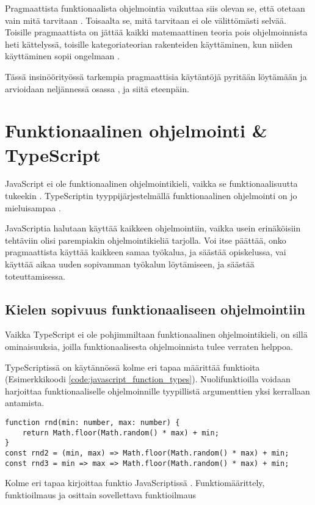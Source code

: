 Pragmaattista funktionaalista ohjelmointia vaikuttaa siis olevan se, että otetaan vain mitä tarvitaan \cite{dear_functional_bros,martin2017pragmaticfp,cantarella_fp_haitat}. Toisaalta se, mitä tarvitaan ei ole välittömästi selvää. Toisille pragmaattista on jättää kaikki matemaattinen teoria pois ohjelmoinnista heti kättelyssä, toisille kategoriateorian rakenteiden käyttäminen, kun niiden käyttäminen sopii ongelmaan \cite{holvikari2021category,martin2017pragmaticfp}.

Tässä insinöörityössä tarkempia pragmaattisia käytäntöjä pyritään löytämään ja arvioidaan neljännessä osassa \textcite{Empiirinen tutkimus}, ja siitä eteenpäin.

\section{Funktionaalinen ohjelmointi \& TypeScript}
JavaScript ei ole funktionaalinen ohjelmointikieli, vaikka se funktionaalisuutta tukeekin \cite{is_reduce_bad}. TypeScriptin tyyppijärjestelmällä funktionaalinen ohjelmointi on jo mieluisampaa \cite{holvikari2021category}.

JavaScriptia halutaan käyttää kaikkeen ohjelmointiin, vaikka usein erinäköisiin tehtäviin olisi parempiakin ohjelmointikieliä tarjolla. Voi itse päättää, onko pragmaattista käyttää kaikkeen samaa työkalua, ja säästää opiskelussa, vai käyttää aikaa uuden sopivamman työkalun löytämiseen, ja säästää toteuttamisessa.


\subsection{Kielen sopivuus funktionaaliseen ohjelmointiin}

Vaikka TypeScript ei ole pohjimmiltaan funktionaalinen ohjelmointikieli, on sillä ominaisuuksia, joilla funktionaalisesta ohjelmoinnista tulee verraten helppoa.

TypeScriptissä on käytännössä kolme eri tapaa määrittää funktioita (Esimerkkikoodi \ref{code:javascript_function_types}). Nuolifunktioilla voidaan harjoittaa funktionaaliselle ohjelmoinnille tyypillistä argumenttien yksi kerrallaan antamista.


\begin{code}
    \begin{verbatim}
function rnd(min: number, max: number) { 
	return Math.floor(Math.random() * max) + min;
}
const rnd2 = (min, max) => Math.floor(Math.random() * max) + min;
const rnd3 = min => max => Math.floor(Math.random() * max) + min;
\end{verbatim}
    \caption{Kolme eri tapaa kirjoittaa funktio JavaScriptissä \cite{okhravi-g-discussion}. Funktiomäärittely, funktioilmaus ja osittain sovellettava funktioilmaus}
    \label{code:javascript_function_types}
\end{code}

